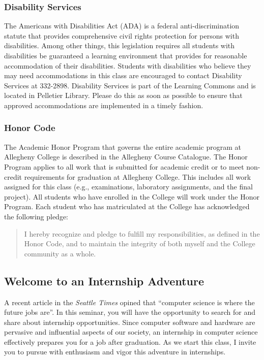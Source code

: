 \subsubsection*{Disability Services}

The Americans with Disabilities Act (ADA) is a federal anti-discrimination statute that provides comprehensive civil
rights protection for persons with disabilities.  Among other things, this legislation requires all students with
disabilities be guaranteed a learning environment that provides for reasonable accommodation of their disabilities.
Students with disabilities who believe they may need accommodations in this class are encouraged to contact Disability
Services at 332-2898.  Disability Services is part of the Learning Commons and is located in Pelletier Library.
Please do this as soon as possible to ensure that approved accommodations are implemented in a timely fashion.

\subsubsection*{Honor Code}

The Academic Honor Program that governs the entire academic program at Allegheny College is described in the Allegheny
Course Catalogue.  The Honor Program applies to all work that is submitted for academic credit or to meet non-credit
requirements for graduation at Allegheny College.  This includes all work assigned for this class (e.g., examinations,
laboratory assignments, and the final project).  All students who have enrolled in the College will work under the Honor
Program.  Each student who has matriculated at the College has acknowledged the following pledge:

\begin{quote}
I hereby recognize and pledge to fulfill my responsibilities, as defined in the Honor Code, and to maintain the
integrity of both myself and the College community as a whole.  
\end{quote}

\subsection*{Welcome to an Internship Adventure}

A recent article in the {\em Seattle Times} opined that ``computer science is where the future jobs are''.  In this
seminar, you will have the opportunity to search for and share about internship opportunities.  Since computer software
and hardware are pervasive and influential aspects of our society, an internship in computer science effectively
prepares you for a job after graduation.  As we start this class, I invite you to pursue with enthusiasm and
vigor this adventure in internships.


